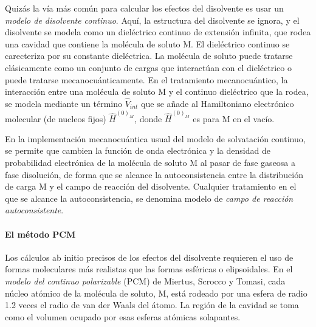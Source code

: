Quiz\'as la v\'ia m\'as com\'un para calcular los efectos del 
disolvente es usar un {\it modelo de disolvente continuo}. Aqu\'i, la
estructura del disolvente se ignora, y el disolvente se modela como 
un diel\'ectrico continuo de extensi\'on infinita, que rodea una 
cavidad que contiene la mol\'ecula de soluto M. El diel\'ectrico 
continuo se carecteriza por su constante diel\'ectrica. La mol\'ecula
de soluto puede tratarse cl\'asicamente como un conjunto de cargas
que interact\'uan con el diel\'ectrico o puede tratarse 
mecanocu\'anticamente. En el tratamiento mecanocu\'antico, la 
interacci\'on entre una mol\'ecula de soluto M y el continuo 
diel\'ectrico que la rodea, se modela mediante un t\'ermino 
$\hat V_{int}$ que se a\~nade al Hamiltoniano electr\'onico molecular
(de nucleos fijos) $\hat H^{(0)_M}$, donde $\hat H^{(0)_M}$ es para M
en el vac\'io.

En la implementaci\'on mecanocu\'antica usual del modelo de 
solvataci\'on continuo, se permite que cambien la funci\'on de onda
electr\'onica y la densidad de probabilidad electr\'onica de la 
mol\'ecula de soluto M al pasar de fase gaseosa a fase disoluci\'on,
de forma que se alcance la autoconsistencia entre la distribuci\'on
de carga M y el campo de reacci\'on del disolvente. Cualquier 
tratamiento en el que se alcance la autoconsistencia, se denomina
modelo de {\it campo de reacci\'on autoconsistente}.

\paragraph{El m\'etodo PCM} Los c\'alculos ab initio precisos de los 
efectos del disolvente requieren el uso de formas moleculares m\'as 
realistas que las formas esf\'ericas o elipsoidales. En el {\it 
modelo del continuo polarizable} (PCM) de Miertus, Scrocco y Tomasi, 
cada n\'ucleo at\'omico de la mol\'ecula de soluto, M, est\'a rodeado
por una esfera de radio 1.2 veces el radio de van der Waals del 
\'atomo. La regi\'on de la cavidad se toma como el volumen ocupado 
por esas esferas at\'omicas solapantes.


